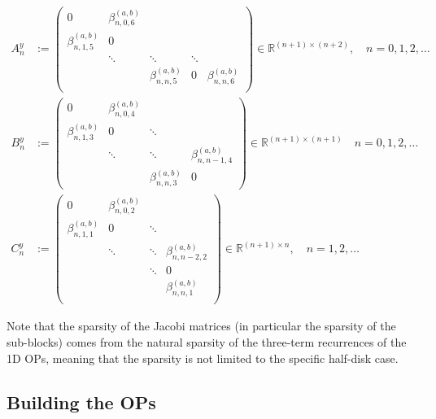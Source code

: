 \documentclass[11pt, oneside]{article}   	%
\newcommand{\R}{\mathbb{R}}
\newcommand{\betaab}{\beta^{(a,b)}}
\begin{document}
\begin{align*}
A^y_n &:= \begin{pmatrix}
		0 & \betaab_{n,0,6} & & & \\
		\betaab_{n,1,5} & 0 & & & \\
		& \ddots & \ddots & \ddots & \\
		& & \betaab_{n,n,5}& 0 & \betaab_{n,n,6} \\
	    \end{pmatrix} \in \R^{(n+1)\times(n+2)}, \quad n = 0,1,2,\dots \\
B^y_n &:= \begin{pmatrix}
		0 & \betaab_{n,0,4} & & \\
		\betaab_{n,1,3} & 0 & \ddots & \\
		& \ddots & \ddots & \betaab_{n,n-1,4} \\
		& & \betaab_{n,n,3} & 0
	    \end{pmatrix} \in \R^{(n+1)\times(n+1)}  \quad n = 0,1,2,\dots \\
C^y_n &:= \begin{pmatrix}
		0 & \betaab_{n,0,2} & & \\
		\betaab_{n,1,1} & 0 & \ddots & \\
		& \ddots & \ddots & \betaab_{n,n-2,2} \\
		& & \ddots & 0 \\
		& & & \betaab_{n,n,1} \\
	    \end{pmatrix} \in \R^{(n+1)\times n}, \quad n = 1,2,\dots
\end{align*}

Note that the sparsity of the Jacobi matrices (in particular the sparsity of the sub-blocks) comes from the natural sparsity of the three-term recurrences of the 1D OPs, meaning that the sparsity is not limited to the specific half-disk case.




\subsection{Building the OPs} 
\end{document}
